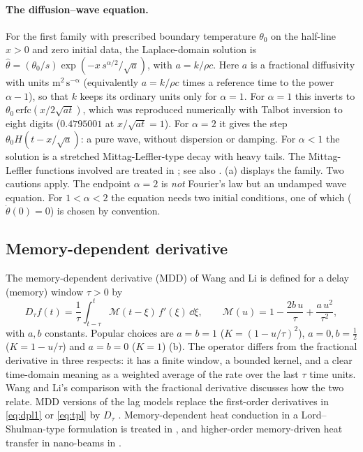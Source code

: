 \paragraph{The diffusion--wave equation.} For the first family with prescribed boundary temperature $\theta_0$ on the half-line $x>0$ and zero initial data, the Laplace-domain solution is $\hat\theta=(\theta_0/s)\exp(-x\,s^{\alpha/2}/\sqrt{a})$, with $a=k/\rho c$. Here $a$ is a fractional diffusivity with units $\mathrm{m^2\,s^{-\alpha}}$ (equivalently $a=k/\rho c$ times a reference time to the power $\alpha-1$), so that $k$ keeps its ordinary units only for $\alpha=1$. For $\alpha=1$ this inverts to $\theta_0\,\mathrm{erfc}(x/2\sqrt{at})$, which was reproduced numerically with Talbot inversion to eight digits ($0.4795001$ at $x/\sqrt{at}=1$). For $\alpha=2$ it gives the step $\theta_0H(t-x/\sqrt a)$: a pure wave, without dispersion or damping. For $\alpha<1$ the solution is a stretched Mittag-Leffler-type decay with heavy tails. The Mittag-Leffler functions involved are treated in \citealp{GorenfloKilbasMainardiRogosin2014}; see also \citealp{Luchko2010}. (a) displays the family. Two cautions apply. The endpoint $\alpha=2$ is \emph{not} Fourier's law but an undamped wave equation. For $1<\alpha<2$ the equation needs two initial conditions, one of which ($\dot\theta(0)=0$) is chosen by convention.

\subsection{Memory-dependent derivative}
The memory-dependent derivative (MDD) of Wang and Li \citep{Wang2011} is defined for a delay (memory) window $\tau>0$ by
\begin{equation}
D_\tau f(t)=\frac1\tau\int_{t-\tau}^{t}\mathcal M(t-\xi)\,f'(\xi)\,\dd\xi,\qquad \mathcal M(u)=1-\frac{2b\,u}{\tau}+\frac{a\,u^2}{\tau^2},\label{eq:mdd}
\end{equation}
with $a,b$ constants. Popular choices are $a=b=1$ ($K=(1-u/\tau)^2$), $a=0,b=\tfrac12$ ($K=1-u/\tau$) and $a=b=0$ ($K=1$) (b). The operator differs from the fractional derivative in three respects: it has a finite window, a bounded kernel, and a clear time-domain meaning as a weighted average of the rate over the last $\tau$ time units. Wang and Li's comparison with the fractional derivative \citep{Wang2021,WangLi2025IV} discusses how the two relate. MDD versions of the lag models replace the first-order derivatives in \eqref{eq:dpl1} or \eqref{eq:tpl} by $D_\tau$ \citep{Singh2019,Singh2020a,Biswas2019,Abouelregal2023,Sur2019,Hamza2014,Sur2012,Yu2014,Sherief2018}. Memory-dependent heat conduction in a Lord--Shulman-type formulation is treated in \citep{Ezzat2015}, and higher-order memory-driven heat transfer in nano-beams in \citep{Sur2025}.

